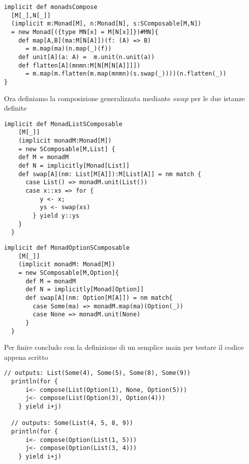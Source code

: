 \begin{lstlisting}[style=myScalastyle, caption=SComposable is Monad]
implicit def monadsCompose
  [M[_],N[_]]
  (implicit m:Monad[M], n:Monad[N], s:SComposable[M,N])
  = new Monad[({type MN[x] = M[N[x]]})#MN]{
    def map[A,B](ma:M[N[A]])(f: (A) => B)
      = m.map(ma)(n.map(_)(f))
    def unit[A](a: A) =  m.unit(n.unit(a))
    def flatten[A](mnmn:M[N[M[N[A]]]])
      = m.map(m.flatten(m.map(mnmn)(s.swap(_))))(n.flatten(_))
}
\end{lstlisting}

Ora definiamo la composizione generalizzata mediante $swap$ per le due istanze
definite
\begin{lstlisting}[style=myScalastyle, caption=Composing List]
  implicit def MonadListSComposable
    [M[_]]
    (implicit monadM:Monad[M])
    = new SComposable[M,List] {
    def M = monadM
    def N = implicitly[Monad[List]]
    def swap[A](nm: List[M[A]]):M[List[A]] = nm match {
      case List() => monadM.unit(List())
      case x::xs => for {
          y <- x;
          ys <- swap(xs)
        } yield y::ys
    }
  }
\end{lstlisting}
\pagebreak
\begin{lstlisting}[style=myScalastyle, caption=Composing Optional]
  implicit def MonadOptionSComposable
    [M[_]]
    (implicit monadM: Monad[M])
    = new SComposable[M,Option]{
      def M = monadM
      def N = implicitly[Monad[Option]]
      def swap[A](nm: Option[M[A]]) = nm match{
        case Some(ma) => monadM.map(ma)(Option(_))
        case None => monadM.unit(None)
      }
  }
\end{lstlisting}

Per finire concludo con la definizione di un semplice main per testare il codice
appena scritto
\begin{lstlisting}[style=myScalastyle, caption=Main]
  // outputs: List(Some(4), Some(5), Some(8), Some(9))
  println(for {
      i<- compose(List(Option(1), None, Option(5)))
      j<- compose(List(Option(3), Option(4)))
    } yield i+j)

  // outputs: Some(List(4, 5, 8, 9))
  println(for {
      i<- compose(Option(List(1, 5)))
      j<- compose(Option(List(3, 4)))
    } yield i+j)
\end{lstlisting}
